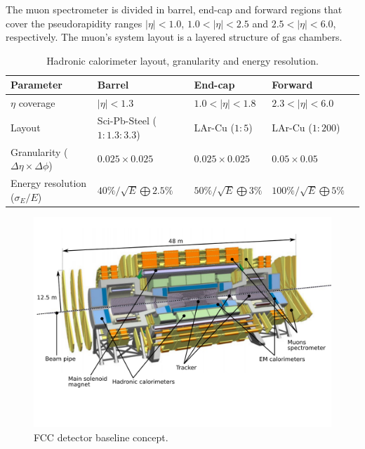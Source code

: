 The muon spectrometer is divided in barrel, end-cap and forward regions that cover the pseudorapidity ranges $|\eta|<1.0$, $1.0<|\eta|<2.5$ and $2.5<|\eta|<6.0$, respectively. The muon's system layout is a layered structure of gas chambers. 

\renewcommand{\arraystretch}{1.5}

\begin{table}
	\centering
	\begin{tabular}{lllll}
		\toprule 
		\textbf{Parameter} & \textbf{Barrel} & \textbf{End-cap} & \textbf{Forward} & \\
		\midrule
		$\eta$ coverage & $|\eta|<1.3$ & $1.0<|\eta|<1.8$ & $2.3<|\eta|<6.0$ & \\
		\rowcolor{black!7}Layout & Sci-Pb-Steel ($1:1.3:3.3$) & LAr-Cu ($1:5$) & LAr-Cu ($1:200$) & \\
		 Granularity ($\Delta \eta \times \Delta \phi$)  & $0.025\times 0.025$ & $0.025\times 0.025$ & $0.05\times 0.05$ &\\
		\rowcolor{black!7}Energy resolution ($\sigma_E/E$) & $40\%/\sqrt{E}\bigoplus 2.5\%$ & $50\%/\sqrt{E}\bigoplus 3\%$ & $100\%/\sqrt{E}\bigoplus 5\%$ & \\
		\bottomrule
	\end{tabular}
	\caption{Hadronic calorimeter layout, granularity and energy resolution.}
	\label{table:FCC_HCAL}
\end{table}

\begin{figure}
	\centering
	\includegraphics[trim={0 4cm 0.5cm 0},clip,width=\textwidth]{./Figures/FCCsvg1.png}
	\caption{FCC detector baseline concept.}
	\label{fig:FCC_detector}
\end{figure} 

